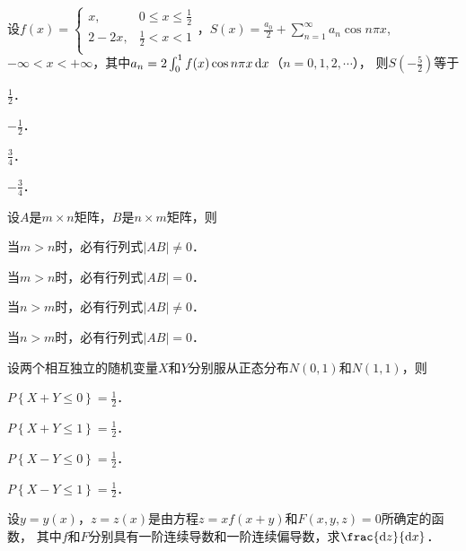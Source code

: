 \documentclass[plain,noanswer,medmath]{../../template/jnuexam}
\begin{document}
\begin{problem}
设$f(x) = \begin{cases}
  x, & 0 \le x \le \frac{1}{2} \\
  2 - 2x, & \frac{1}{2} < x < 1 \\
\end{cases}$，$S(x) = \frac{a_0}{2} + \sum_{n = 1}^{\infty}a_n\cos n\pi x$,
$-\infty < x < +\infty$，其中$a_n = 2\int_0^1 f(x)\cos n\pi x\mathop{}\!\mathrm{d} x$（$n = 0,1,2,\cdots$），
则$S\left(- \frac{5}{2} \right)$等于\pickout{}
\begin{abcd}
  \item $\frac{1}{2}$．
  \item $- \frac{1}{2}$．
  \item $\frac{3}{4}$．
  \item $- \frac{3}{4}$．
\end{abcd}
\end{problem}


\begin{problem}
设$A$是$m \times n$矩阵，$B$是$n \times m$矩阵，则\pickout{}
\begin{abcd}
\item 当$m > n$时，必有行列式$|AB| \ne 0$．
\item 当$m > n$时，必有行列式$|AB| = 0$．
\item 当$n > m$时，必有行列式$|AB| \ne 0$．
\item 当$n > m$时，必有行列式$|AB| = 0$．
\end{abcd}
\end{problem}


\begin{problem}
设两个相互独立的随机变量$X$和$Y$分别服从正态分布$N(0,1)$和$N(1,1)$，则\pickout{}
\begin{abcd}
\item $P\left\{X + Y \le 0 \right\} = \frac{1}{2}$．
\item $P\left\{X + Y \le 1 \right\} = \frac{1}{2}$．
\item $P\left\{X - Y \le 0 \right\} = \frac{1}{2}$．
\item $P\left\{X - Y \le 1 \right\} = \frac{1}{2}$．
\end{abcd}
\end{problem}



\begin{problem}
设$y = y(x)$，$z = z(x)$是由方程$z = xf(x + y)$和$F(x,y,z) = 0$所确定的函数，
其中$f$和$F$分别具有一阶连续导数和一阶连续偏导数，求$\frac{\dz}{\dx}$．
\end{problem}
\end{document}
